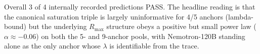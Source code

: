 Overall 3 of 4 internally recorded predictions PASS.  The headline reading is that the canonical saturation triple is largely uninformative for 4/5 anchors (lambda-bound) but the underlying $R_{\max}$ structure obeys a positive but small power law ($\alpha\approx -0.06$) on both the 5- and 9-anchor pools, with Nemotron-120B standing alone as the only anchor whose $\lambda$ is identifiable from the trace.